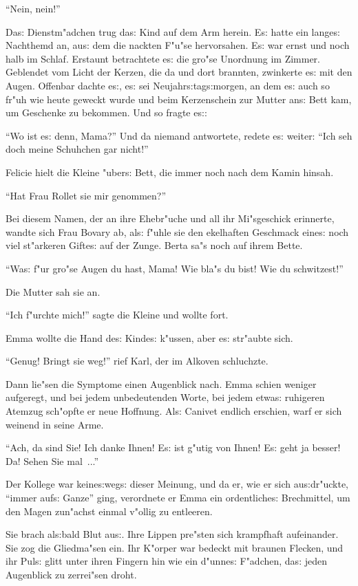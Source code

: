 \documentclass[oneside,12pt]{book}
\newcommand{\s}{s:}%
\begin{document}
"`Nein, nein!"'

Da{\s} Dienstm"adchen trug da{\s} Kind auf dem Arm herein. E{\s}
hatte ein lange{\s} Nachthemd an, au{\s} dem die nackten F"u"se
hervorsahen. E{\s} war ernst und noch halb im Schlaf. Erstaunt
betrachtete e{\s} die gro"se Unordnung im Zimmer. Geblendet vom
Licht der Kerzen, die da und dort brannten, zwinkerte e{\s} mit
den Augen. Offenbar dachte e{\s}, e{\s} sei
Neujahr{\s}tag{\s}morgen, an dem e{\s} auch so fr"uh wie heute
geweckt wurde und beim Kerzenschein zur Mutter an{\s} Bett kam, um
Geschenke zu bekommen. Und so fragte e{\s}:

"`Wo ist e{\s} denn, Mama?"' Und da niemand antwortete, redete
e{\s} weiter: "`Ich seh doch meine Schuhchen gar nicht!"'

Felicie hielt die Kleine "uber{\s} Bett, die immer noch nach dem
Kamin hinsah.

"`Hat Frau Rollet sie mir genommen?"'

Bei diesem Namen, der an ihre Ehebr"uche und all ihr Mi"sgeschick
erinnerte, wandte sich Frau Bovary ab, al{\s} f"uhle sie den
ekelhaften Geschmack eine{\s} noch viel st"arkeren Gifte{\s} auf
der Zunge. Berta sa"s noch auf ihrem Bette.

"`Wa{\s} f"ur gro"se Augen du hast, Mama! Wie bla"s du bist! Wie
du schwitzest!"'

Die Mutter sah sie an.

"`Ich f"urchte mich!"' sagte die Kleine und wollte fort.

Emma wollte die Hand de{\s} Kinde{\s} k"ussen, aber e{\s}
str"aubte sich.

"`Genug! Bringt sie weg!"' rief Karl, der im Alkoven schluchzte.

Dann lie"sen die Symptome einen Augenblick nach. Emma schien
weniger aufgeregt, und bei jedem unbedeutenden Worte, bei jedem
etwa{\s} ruhigeren Atemzug sch"opfte er neue Hoffnung. Al{\s}
Canivet endlich erschien, warf er sich weinend in seine Arme.

"`Ach, da sind Sie! Ich danke Ihnen! E{\s} ist g"utig von Ihnen!
E{\s} geht ja besser! Da! Sehen Sie mal~..."'

Der Kollege war keine{\s}weg{\s} dieser Meinung, und da er, wie er
sich au{\s}dr"uckte, "`immer auf{\s} Ganze"' ging, verordnete er
Emma ein ordentliche{\s} Brechmittel, um den Magen zun"achst
einmal v"ollig zu entleeren.

Sie brach al{\s}bald Blut au{\s}. Ihre Lippen pre"sten sich
krampfhaft aufeinander. Sie zog die Gliedma"sen ein. Ihr K"orper
war bedeckt mit braunen Flecken, und ihr Pul{\s} glitt unter ihren
Fingern hin wie ein d"unne{\s} F"adchen, da{\s} jeden Augenblick
zu zerrei"sen droht.
\end{document}

